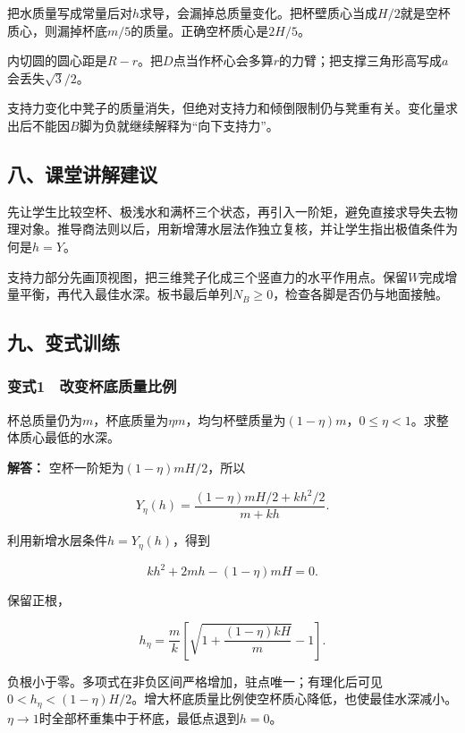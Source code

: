 \documentclass[12pt,a4paper,fontset=fandol]{ctexart}
\begin{document}
把水质量写成常量后对\(h\)求导，会漏掉总质量变化。把杯壁质心当成\(H/2\)就是空杯质心，则漏掉杯底\(m/5\)的质量。正确空杯质心是\(2H/5\)。

内切圆的圆心距是\(R-r\)。把\(D\)点当作杯心会多算\(r\)的力臂；把支撑三角形高写成\(a\)会丢失\(\sqrt3/2\)。

支持力变化中凳子的质量消失，但绝对支持力和倾倒限制仍与凳重有关。变化量求出后不能因\(B\)脚为负就继续解释为``向下支持力''。

\subsection{八、课堂讲解建议}\label{ux516bux8bfeux5802ux8bb2ux89e3ux5efaux8bae}

先让学生比较空杯、极浅水和满杯三个状态，再引入一阶矩，避免直接求导失去物理对象。推导商法则以后，用新增薄水层法作独立复核，并让学生指出极值条件为何是\(h=Y\)。

支持力部分先画顶视图，把三维凳子化成三个竖直力的水平作用点。保留\(W\)完成增量平衡，再代入最佳水深。板书最后单列\(N_B\ge0\)，检查各脚是否仍与地面接触。

\subsection{九、变式训练}\label{ux4e5dux53d8ux5f0fux8badux7ec3}

\subsubsection{变式1　改变杯底质量比例}\label{ux53d8ux5f0f1-ux6539ux53d8ux676fux5e95ux8d28ux91cfux6bd4ux4f8b}

杯总质量仍为\(m\)，杯底质量为\(\eta m\)，均匀杯壁质量为\((1-\eta)m\)，\(0\le\eta<1\)。求整体质心最低的水深。

\textbf{解答：} 空杯一阶矩为\((1-\eta)mH/2\)，所以

\[
Y_\eta(h)=\frac{(1-\eta)mH/2+kh^2/2}{m+kh}.
\]

利用新增水层条件\(h=Y_\eta(h)\)，得到

\[
kh^2+2mh-(1-\eta)mH=0.
\]

保留正根，

\[
\boxed{h_\eta=\frac m k
\left[\sqrt{1+\frac{(1-\eta)kH}m}-1\right]}.
\]

负根小于零。多项式在非负区间严格增加，驻点唯一；有理化后可见\(0<h_\eta<(1-\eta)H/2\)。增大杯底质量比例使空杯质心降低，也使最佳水深减小。\(\eta\to1\)时全部杯重集中于杯底，最低点退到\(h=0\)。
\end{document}
